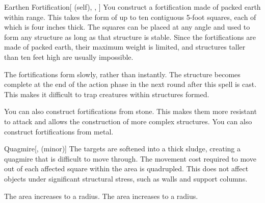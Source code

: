 \lowercase{\hypertarget{spell:Earthen Fortification}{}}\label{spell:Earthen Fortification}
\begin{attuneability}[Rank 4]{\hypertarget{spell:Earthen Fortification}{Earthen Fortification}}[ (self), , ]
\targetrule
You construct a fortification made of packed earth within \rngmed range.
This takes the form of up to ten contiguous 5-foot squares, each of which is four inches thick.
The squares can be placed at any angle and used to form any structure as long as that structure is stable.
Since the fortifications are made of packed earth, their maximum weight is limited, and structures taller than ten feet high are usually impossible.

The fortifications form slowly, rather than instantly.
The structure becomes complete at the end of the action phase in the next round after this spell is cast.
This makes it difficult to trap creatures within structures formed.

\rankline
{} You can also construct fortifications from stone.
This makes them more resistant to attack and allows the construction of more complex structures.
 You can also construct fortifications from metal.
\end{attuneability}
\vspace{0.25em}



\lowercase{\hypertarget{spell:Quagmire}{}}\label{spell:Quagmire}
\begin{freeability}[Rank 4]{\hypertarget{spell:Quagmire}{Quagmire}}[,  (minor)]
The targets are softened into a thick sludge, creating a quagmire that is difficult to move through.
The movement cost required to move out of each affected square within the area is quadrupled.
This does not affect objects under significant structural stress, such as walls and support columns.

\rankline
{} The area increases to a \arealarge radius.
 The area increases to a \areahuge radius.
\end{freeability}
\vspace{0.25em}




